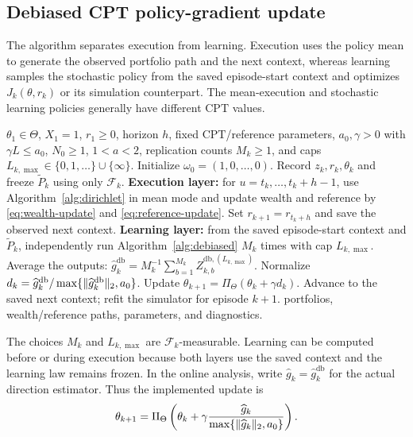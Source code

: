 \documentclass[11pt]{article}
\newcommand{\1}{\mathbf 1}
\DeclarePairedDelimiter{\norm}{\lVert}{\rVert}
\newcommand{\cF}{\mathcal F}
\newcommand{\CPT}{\ensuremath{\mathrm{CPT}}\xspace}
\newcommand{\DRCPTPG}{\ensuremath{\mathrm{DRCPT\mbox{-}PG}}\xspace}
\newcommand{\db}{\mathrm{db}}
\begin{document}
\subsection{Debiased CPT policy-gradient update}
The algorithm separates execution from learning. Execution uses the policy mean to generate the observed portfolio path and the next context, whereas learning samples the stochastic policy from the saved episode-start context and optimizes $J_k(\theta,r_k)$ or its simulation counterpart. The mean-execution and stochastic learning policies generally have different \CPT values.


\begin{algorithm}[t]
\caption{Dynamic-reference \CPT policy gradient (\DRCPTPG)}\label{alg:drcptpg}
\begin{algorithmic}[1]
\Require $\theta_1\in\Theta$, $X_1=1$, $r_1\ge0$, horizon $h$, fixed \CPT/reference parameters, $a_0,\gamma>0$ with $\gamma L\le a_0$, $N_0\ge1$, $1<a<2$, replication counts $M_k\ge1$, and caps $L_{k,\max}\in\{0,1,\ldots\}\cup\{\infty\}$.
\State Initialize $\omega_0=(1,0,\ldots,0)$.
    \State Record $z_k,r_k,\theta_k$ and freeze $\widetilde P_k$ using only $\cF_k$.
    \State \textbf{Execution layer:} for $u=t_k,\ldots,t_k+h-1$, use Algorithm~\ref{alg:dirichlet} in mean mode and update wealth and reference by \eqref{eq:wealth-update} and \eqref{eq:reference-update}.
    \State Set $r_{k+1}=r_{t_k+h}$ and save the observed next context.
    \State \textbf{Learning layer:} from the saved episode-start context and $\widetilde P_k$, independently run Algorithm~\ref{alg:debiased} $M_k$ times with cap $L_{k,\max}$.
    \State Average the outputs: $\widehat g_k^{\db}=M_k^{-1}\sum_{b=1}^{M_k}Z_{k,b}^{\db,(L_{k,\max})}$.
    \State Normalize $d_k=\widehat g_k^{\db}/\max\{\norm{\widehat g_k^{\db}}_2,a_0\}$.
    \State Update $\theta_{k+1}=\Pi_\Theta(\theta_k+\gamma d_k)$.
    \State Advance to the saved next context; refit the simulator for episode $k+1$.
\EndFor
\State \Return portfolios, wealth/reference paths, parameters, and diagnostics.
\end{algorithmic}
\end{algorithm}

The choices $M_k$ and $L_{k,\max}$ are $\cF_k$-measurable. Learning can be computed before or during execution because both layers use the saved context and the learning law remains frozen. In the online analysis, write $\widehat g_k=\widehat g_k^{\db}$ for the actual direction estimator. Thus the implemented update is
\begin{equation}\label{eq:parameter-update}
 \theta_{k+1}=\Pi_\Theta\left(\theta_k+
 \gamma\frac{\widehat g_k}{\max\{\norm{\widehat g_k}_2,a_0\}}\right).
\end{equation}
\end{document}
